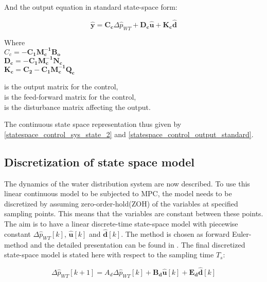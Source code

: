 And the output equation in standard state-space form:

\begin{equation}
  \pmb{\hat{y}} = \pmb{C_c} \Delta \hat{p}_{WT} + \pmb{D_c} \pmb{\hat{u}} + \pmb{K_c} \pmb{\hat{d}}
\label{statespace_control_output_standard}
\end{equation}

\begin{minipage}[t]{0.40\textwidth}
Where\\
\hspace*{8mm} $C_c = -\pmb{C_1}\pmb{M_c^{-1}}\pmb{B_o} $ \\
\hspace*{8mm} $\pmb{D_c} = - \pmb{C_1}\pmb{M_c^{-1}}\pmb{N_c} $ \\
\hspace*{8mm} $\pmb{K_c} = \pmb{C_2} -\pmb{C_1}\pmb{M_c^{-1}}\pmb{Q_c} $
\end{minipage}
\begin{minipage}[t]{0.48\textwidth}
\vspace*{1mm}
is the output matrix for the control, \\
is the feed-forward matrix for the control, \\
is the disturbance matrix affecting the output.
\end{minipage} 

The continuous state space representation thus given by \eqref{statespace_control_sys_state_2} and \eqref{statespace_control_output_standard}.

\subsection{Discretization of state space model}
 \label{discrete_SS}
 
The dynamics of the water distribution system are now described. To use this linear continuous model to be subjected to MPC, the model needs to be discretized by assuming zero-order-hold(ZOH) of the variables at specified sampling points. This means that the variables are constant between these points. The aim is to have a linear discrete-time state-space model with piecewise constant $\Delta \hat{p}_{WT}[k]$, $\pmb{\hat{u}}[k]$ and $\pmb{\hat{d}}[k]$. The method is chosen as forward Euler-method and the detailed presentation can be found in . The final discretized state-space model is stated here with respect to the sampling time $T_s$: 

 \begin{equation}
\Delta \hat{p}_{WT} [k+1] = A_d \Delta \hat{p}_{WT}[k]  + \pmb{B_d} \pmb{\hat{u}}[k] + \pmb{E_d} \pmb{\hat{d}}[k] 
 \label{statespace_discrete_state}
\end{equation}

